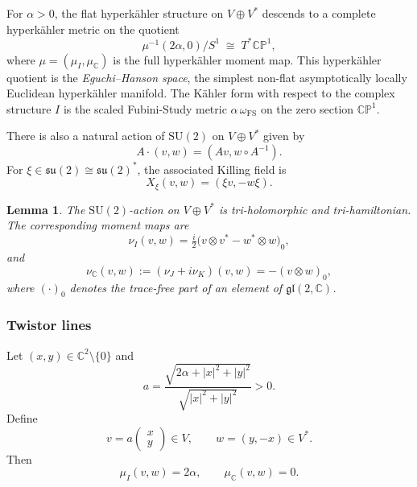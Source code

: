 \documentclass[12pt,a4paper]{amsart}
\newtheorem{lemma}[theorem]{Lemma}
\theoremstyle{definition}
\theoremstyle{remark}
\newcommand{\C}{\mathbb C}
\newcommand{\CP}{\mathbb{CP}}
\begin{document}
\noindent

For $\alpha>0$, the flat hyperk\"ahler structure on $V\oplus V^*$ descends to a complete
hyperk\"ahler metric on the quotient
\[
\mu^{-1}(2\alpha,0)\big/S^1 \;\cong\; T^*\CP^1,
\]
where $\mu=(\mu_I,\mu_\C)$ is the full hyperk\"ahler moment map. 
This hyperk\"ahler quotient  is the \emph{Eguchi--Hanson space}, 
the simplest non-flat asymptotically locally Euclidean hyperk\"ahler manifold. The K\"ahler form with respect to 
the complex structure $I$ is the scaled Fubini-Study metric $\alpha\,\omega_{\mathrm{FS}}$ on the zero section $\CP^1$.


There is also a natural action of $\mathrm{SU}(2)$ on $V\oplus V^*$ given by
\[
A\cdot(v,w)=(Av,w\circ A^{-1}).
\]
For $\xi\in\mathfrak{su}(2)\cong\mathfrak{su}(2)^*$, the associated Killing field is
\[
X_\xi(v,w)=(\xi v,-w\xi).
\]

\begin{lemma}\label{lem:1legmoment}
The $\mathrm{SU}(2)$-action on $V\oplus V^*$ is tri-holomorphic and tri-hamiltonian.
The corresponding moment maps are
\[
\nu_I(v,w)=\tfrac{i}{2}\bigl(v\otimes v^*-w^*\otimes w\bigr)_0,
\]
and
\[
\nu_\C(v,w):=(\nu_J+i\nu_K)(v,w)=-(v\otimes w)_0,
\]
where $(\cdot)_0$ denotes the trace-free part of an element of $\mathfrak{gl}(2,\C)$.
\end{lemma}

\subsubsection{Twistor lines}\label{sec:hptwistor}
Let $(x,y)\in \C^2\setminus\{0\}$ and 
\[a=\frac{\sqrt{2\alpha+|x|^2+|y|^2}}{\sqrt{|x|^2+|y|^2}}>0.\]
Define
\begin{equation}\label{eq:vwxy}
v=a\begin{pmatrix}x\\y\end{pmatrix}\in V,
\qquad
w=(y,-x)\in V^*.
\end{equation}
Then
\[
\mu_I(v,w)=2\alpha,
\qquad
\mu_\C(v,w)=0.
\]
\end{document}
